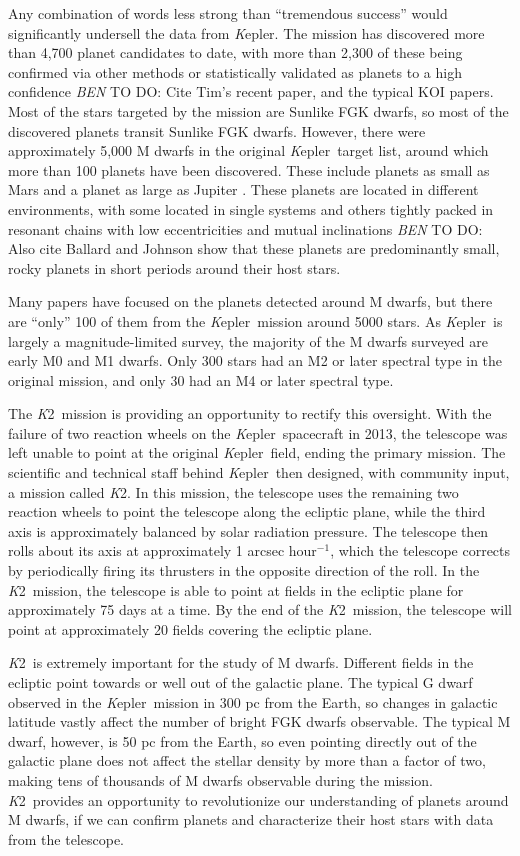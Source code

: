 \documentclass[12pt]{caltech_thesis}
\newcommand{\todo}[3]{{\color{#2} \emph{#1} TO DO: #3}}
\newcommand{\btmtodo}[1]{\todo{BEN}{red}{#1}}
\newcommand{\kep}{{\textit Kepler}}
\newcommand{\KT}{{\textit K2}}
\begin{document}
Any combination of words less strong than ``tremendous success'' would significantly undersell the data from \kep.
The mission has discovered more than 4,700 planet candidates to date, with more than 
2,300 of these being confirmed via other methods or statistically validated as planets
to a high confidence \btmtodo{Cite Tim's recent paper, and the typical KOI papers}.
Most of the stars targeted by the mission are Sunlike FGK dwarfs, so most of the discovered
planets transit Sunlike FGK dwarfs.
However, there were approximately 5,000 M dwarfs in the original \kep\ target list, around
which more than 100 planets have been discovered.
These include planets as small as Mars \citep{KOI961} and a planet as large as Jupiter
\citep{Johnson11c}.
These planets are located in different environments, with some located in single systems
and others tightly packed in resonant chains with low eccentricities and mutual inclinations
\citep{Swift13} \btmtodo{Also cite Ballard and Johnson}
\citet{Morton14} show that these planets are predominantly small, rocky planets in short
periods around their host stars.

Many papers have focused on the planets detected around M dwarfs, but there are ``only'' 100
of them from the \kep\ mission around 5000 stars. As \kep\ is largely a magnitude-limited
survey, the majority of the M dwarfs surveyed are early M0 and M1 dwarfs. 
Only 300 stars had an M2 or later spectral type in the original mission, and only 30 had
an M4 or later spectral type.

The \KT\ mission is providing an opportunity to rectify this oversight.
With the failure of two reaction wheels on the \kep\ spacecraft in 2013, the telescope
was left unable to point at the original \kep\ field, ending the primary mission.
The scientific and technical staff behind \kep\ then designed, with community input,
a mission called \KT. 
In this mission, the telescope uses the remaining two reaction wheels to point the telescope
along the ecliptic plane, while the third axis is approximately balanced by solar radiation
pressure.
The telescope then rolls about its axis at approximately 1 arcsec hour$^{-1}$, which 
the telescope corrects by periodically firing its thrusters in the opposite direction
of the roll.
In the \KT\ mission, the telescope is able to point at fields in the ecliptic plane for
approximately 75 days at a time.
By the end of the \KT\ mission, the telescope will point at approximately 20 fields
covering the ecliptic plane.

\KT\ is extremely important for the study of M dwarfs.
Different fields in the ecliptic point towards or well out of the galactic plane.
The typical G dwarf observed in the \kep\ mission in 300 pc from the Earth, so changes
in galactic latitude vastly affect the number of bright FGK dwarfs observable.
The typical M dwarf, however, is 50 pc from the Earth, so even pointing directly out of the
galactic plane does not affect the stellar density by more than a factor of two, making 
tens of thousands of M dwarfs observable during the mission. 
\KT\ provides an opportunity to revolutionize our understanding of planets around M dwarfs,
if we can confirm planets and characterize their host stars with data from the telescope.
\end{document}
